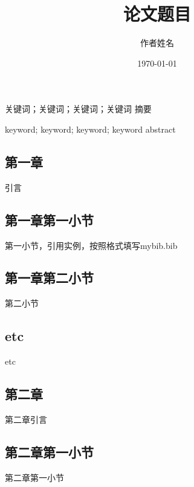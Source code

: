 \documentclass[twoside]{CUGThesis}
\title{论文题目} %
\author{作者姓名} %
\date{\today} %
\begin{document}
	\maketitle
	\makestatement
	
	\begin{cnabstract}{关键词；关键词；关键词；关键词}
		摘要
	\end{cnabstract}
	
	\begin{enabstract}{keyword; keyword; keyword; keyword}
		abstract
	\end{enabstract}
	
	\makeToc
	
	
	\begin{spacing}{2}
		\section{第一章}
	\end{spacing}
	引言
	\subsection{第一章第一小节}
	第一小节，引用实例\cite{引用}，按照格式填写mybib.bib
	\subsection{第一章第二小节}
	第二小节
	\subsection{etc}
	etc
	
	
	\begin{spacing}{2}
		\section{第二章}
	\end{spacing}
	第二章引言
	\subsection{第二章第一小节}
	第二章第一小节
\end{document}
